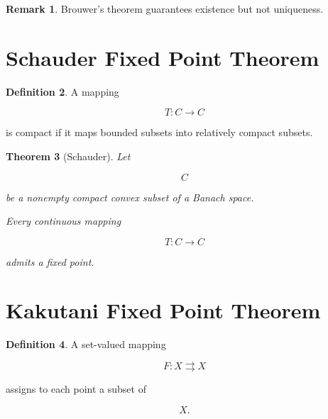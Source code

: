 \documentclass[11pt]{book}
\numberwithin{equation}{chapter}
\theoremstyle{definition}
\newtheorem{definition}{Definition}[chapter]
\newtheorem{remark}[definition]{Remark}
\theoremstyle{plain}
\newtheorem{theorem}[definition]{Theorem}
\begin{document}
\begin{remark}

Brouwer's theorem guarantees existence but not uniqueness.

\end{remark}


\section{Schauder Fixed Point Theorem}

\begin{definition}

A mapping

\[
T:C\rightarrow C
\]

is compact if it maps bounded subsets into relatively compact subsets.

\end{definition}


\begin{theorem}[Schauder]

Let

\[
C
\]

be a nonempty compact convex subset of a Banach space.

Every continuous mapping

\[
T:C\rightarrow C
\]

admits a fixed point.

\end{theorem}


\section{Kakutani Fixed Point Theorem}

\begin{definition}

A set-valued mapping

\[
F:X
\rightrightarrows
X
\]

assigns to each point a subset of

\[
X.
\]

\end{definition}

\end{document}

